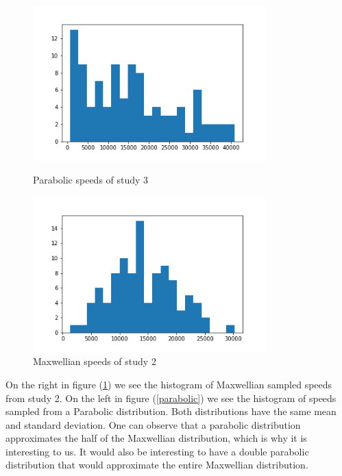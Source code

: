 \documentclass[12pt]{article}
\begin{document}
	\begin{figure}[H]
		\begin{multicols}{2}
			\includegraphics[width=\linewidth, height=6cm]{parabolic speed sampling.png} \caption{Parabolic speeds of study 3} \label{parabolic} \par
			\includegraphics[width=\linewidth, height=6cm]{maxwellian speed sampling.png} \caption{Maxwellian speeds of study 2} \label{maxwellian} \par
		\end{multicols}
	\end{figure}
	\noindent On the right in figure (\ref{maxwellian}) we see the histogram of Maxwellian sampled speeds from study 2. On the left in figure (\ref{parabolic}) we see the histogram of speeds sampled from a Parabolic distribution. Both distributions have the same mean and standard deviation. One can observe that a parabolic distribution approximates the half of the Maxwellian distribution, which is why it is interesting to us. It would also be interesting to have a double parabolic distribution that would approximate the entire Maxwellian distribution.  
\end{document}
